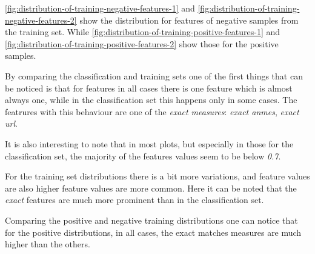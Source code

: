 \documentclass[epsfig,a4paper,11pt,titlepage,twoside,openany]{book}
\begin{document}
\autoref{fig:distribution-of-training-negative-features-1} and \autoref{fig:distribution-of-training-negative-features-2} show the distribution for features of negative samples from the training set. While \autoref{fig:distribution-of-training-positive-features-1} and \autoref{fig:distribution-of-training-positive-features-2} show those for the positive samples.

By comparing the classification and training sets one of the first things that can be noticed is that for features in all cases there is one feature which is almost always one, while in the classification set this happens only in some cases. The featrures with this behaviour are one of the \textit{exact measures}: \textit{exact anmes}, \textit{exact url}.

It is also interesting to note that in most plots, but especially in those for the classification set, the majority of the features values seem to be below \textit{0.7}.

For the training set distributions there is a bit more variations, and feature values are also higher feature values are more common. Here it can be noted that the \textit{exact} features are much more prominent than in the classification set. 

Comparing the positive and negative training distributions one can notice that for the positive distributions, in all cases, the exact matches measures are much higher than the others.

\end{document}
